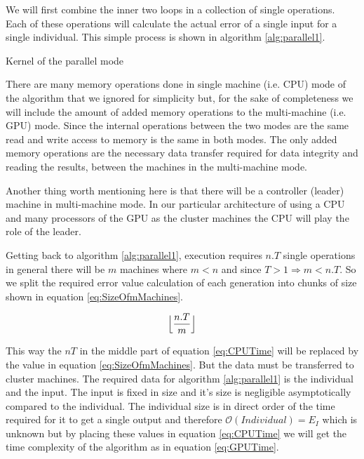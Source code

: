 \documentclass[twocolumn]{article}
\begin{document}
We will first combine the inner two loops in a collection of single operations. Each of these operations will calculate the actual error of a single input for a single individual. This simple process is shown in algorithm \ref{alg:parallel1}.

\begin{algorithm}
    \caption{Kernel of the parallel mode}
    \label{alg:parallel1}
    \begin{algorithmic}
    \end{algorithmic}
\end{algorithm}

There are many memory operations done in single machine (i.e. CPU) mode of the algorithm that we ignored for simplicity but, for the sake of completeness we will include the amount of added memory operations to the multi-machine (i.e. GPU) mode. Since the internal operations between the two modes are the same read and write access to memory is the same in both modes. The only added memory operations are the necessary data transfer required for data integrity and reading the results, between the machines in the multi-machine mode.

Another thing worth mentioning here is that there will be a controller (leader) machine in multi-machine mode. In our particular architecture of using a CPU and many processors of the GPU as the cluster machines the CPU will play the role of the leader.

Getting back to algorithm \ref{alg:parallel1}, execution requires $n.T$ single operations in general there will be $m$ machines where $m<n$ and since $T>1 \Rightarrow m<n.T$. So we split the required error value calculation of each generation into chunks of size shown in equation \ref{eq:SizeOfmMachines}.

\begin{equation}
    \label{eq:SizeOfmMachines}
    \Bigl\lfloor \frac{n.T}{m} \Bigr\rfloor    
\end{equation}

This way the $nT$ in the middle part of equation \ref{eq:CPUTime} will be replaced by the value in equation \ref{eq:SizeOfmMachines}. But the data must be transferred to cluster machines. The required data for algorithm \ref{alg:parallel1} is the individual and the input. The input is fixed in size and it's size is negligible asymptotically compared to the individual. The individual size is in direct order of the time required for it to get a single output and therefore $\mathcal{O}(Individual)=E_I$ which is unknown but by placing these values in equation \ref{eq:CPUTime} we will get the time complexity of the algorithm as in equation \ref{eq:GPUTime}.
\end{document}
